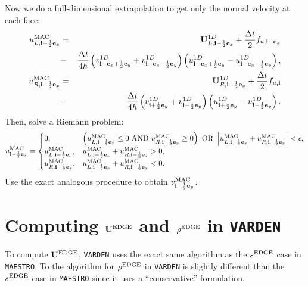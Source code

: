 \documentclass[11pt]{article}
\def\half  {\frac{1}{2}}
\def\dt    {\Delta t}
\def\edge  {\rm EDGE}
\def\mac   {\rm MAC}
\def\eb    {{\bf e}}
\def\ib    {{\bf i}}
\def\Ub    {{\bf U}}
\begin{document}
Now we do a full-dimensional extrapolation to get only the normal velocity at each face:
\begin{eqnarray}
u_{L,\ib-\half\eb_x}^{\mac} &=& \Ub_{L,\ib-\half\eb_x}^{1D} + \frac{\dt}{2}f_{u,\ib-\eb_x} \nonumber \\
&-& \frac{\dt}{4h}\left(v_{\ib-\eb_x+\half\eb_y}^{1D}+v_{\ib-\eb_x-\half\eb_y}^{1D}\right)\left(u_{\ib-\eb_x+\half\eb_y}^{1D} - u_{\ib-\eb_x-\half\eb_y}^{1D}\right), \\
u_{R,\ib-\half\eb_x}^{\mac} &=& \Ub_{R,\ib-\half\eb_x}^{1D} + \frac{\dt}{2}f_{u,\ib} \nonumber \\
&-& \frac{\dt}{4h}\left(v_{\ib+\half\eb_y}^{1D}+v_{\ib-\half\eb_y}^{1D}\right)\left(u_{\ib+\half\eb_y}^{1D} - u_{\ib-\half\eb_y}^{1D}\right).
\end{eqnarray}
Then, solve a Riemann problem:
\begin{equation}
u_{\ib-\half\eb_x}^{\mac} =
\begin{cases}
0, & \left(u_{L,\ib-\half\eb_x}^{\mac} \le 0 ~ {\rm AND} ~ u_{R,\ib-\half\eb_x}^{\mac} \ge 0\right) ~ {\rm OR} ~ \left|u_{L,\ib-\half\eb_x}^{\mac} + u_{R,\ib-\half\eb_x}^{\mac}\right| < \epsilon, \\
u_{L,\ib-\half\eb_x}^{\mac}, & u_{L,\ib-\half\eb_x}^{\mac} + u_{R,\ib-\half\eb_x}^{\mac} > 0, \\
u_{R,\ib-\half\eb_x}^{\mac}, & u_{L,\ib-\half\eb_x}^{\mac} + u_{R,\ib-\half\eb_x}^{\mac} < 0.
\end{cases}
\end{equation}
Use the exact analogous procedure to obtain $v^{\mac}_{\ib-\half\eb_y}$.
\cleardoublepage
\section{Computing $\Ub^{\edge}$ and $\rho^{\edge}$ in {\tt VARDEN}}
To compute $\Ub^{\edge}$, {\tt VARDEN} uses the exact same algorithm as the $s^{\edge}$ case in {\tt MAESTRO}.  To the algorithm for $\rho^{\edge}$ in {\tt VARDEN} is slightly different than the $s^{\edge}$ case in {\tt MAESTRO} since it uses a ``conservative'' formulation.  
\end{document}
